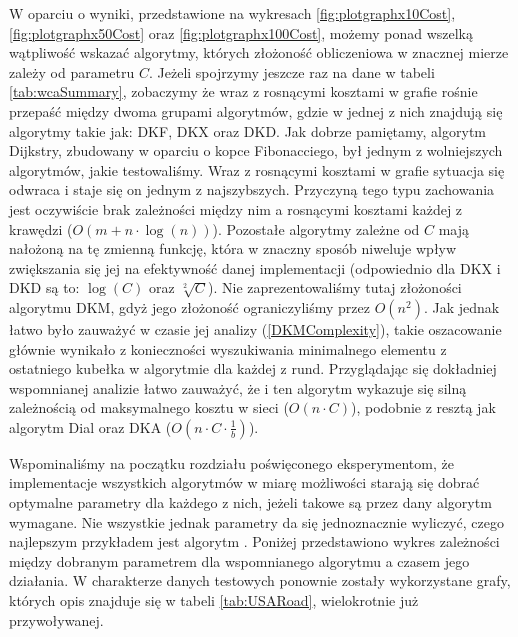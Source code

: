 W oparciu o wyniki, przedstawione na wykresach \ref{fig:plotgraphx10Cost}, \ref{fig:plotgraphx50Cost} oraz \ref{fig:plotgraphx100Cost}, możemy ponad wszelką wątpliwość wskazać algorytmy, których złożoność obliczeniowa w znacznej mierze zależy od parametru $C$. Jeżeli spojrzymy jeszcze raz na dane w tabeli \ref{tab:wcaSummary}, zobaczymy że wraz z rosnącymi kosztami w grafie rośnie przepaść między dwoma grupami algorytmów, gdzie w jednej z nich znajdują się algorytmy takie jak: \textsc{DKF}, \textsc{DKX} oraz \textsc{DKD}. Jak dobrze pamiętamy, algorytm Dijkstry, zbudowany w oparciu o kopce Fibonacciego, był jednym z wolniejszych algorytmów, jakie testowaliśmy. Wraz z rosnącymi kosztami w grafie sytuacja się odwraca i staje się on jednym z najszybszych. Przyczyną tego typu zachowania jest oczywiście brak zależności między nim a rosnącymi kosztami każdej z krawędzi ($ O \left( m + n \cdot \log \left( n \right) \right)$). Pozostałe algorytmy zależne od $C$ mają nałożoną na tę zmienną funkcję, która w znaczny sposób niweluje wpływ zwiększania się jej na efektywność danej implementacji (odpowiednio dla \textsc{DKX} i \textsc{DKD} są to: $\log \left( C \right)$ oraz $ \sqrt[2]{C}$). Nie zaprezentowaliśmy tutaj złożoności algorytmu \textsc{DKM}, gdyż jego złożoność ograniczyliśmy przez $O \left( n^{2} \right)$. Jak jednak łatwo było zauważyć w czasie jej analizy (\ref{DKMComplexity}), takie oszacowanie głównie wynikało z konieczności wyszukiwania minimalnego elementu z ostatniego kubełka w algorytmie dla każdej z rund. Przyglądając się dokładniej wspomnianej analizie łatwo zauważyć, że i ten algorytm wykazuje się silną zależnością od maksymalnego kosztu w sieci ($O \left( n \cdot C \right)$), podobnie z resztą jak algorytm Dial oraz \textsc{DKA} ($O \left( n \cdot C \cdot \frac{1}{b} \right)$).

Wspominaliśmy na początku rozdziału poświęconego eksperymentom, że implementacje wszystkich algorytmów w miarę możliwości starają się dobrać optymalne parametry dla każdego z nich, jeżeli takowe są przez dany algorytm wymagane. Nie wszystkie jednak parametry da się jednoznacznie wyliczyć, czego najlepszym przykładem jest algorytm . Poniżej przedstawiono wykres zależności między dobranym parametrem dla wspomnianego algorytmu a czasem jego działania. W charakterze danych testowych ponownie zostały wykorzystane grafy, których opis znajduje się w tabeli \ref{tab:USARoad}, wielokrotnie już przywoływanej.

